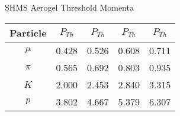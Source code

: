 \begin{Mtable}{SHMS Aerogel Threshold Momenta}
  \centering
  \begin{tabular}{|c|c|c|c|c|}
    \hline
    \textbf{Particle} & \textbf{$P_{Th}$} & \textbf{$P_{Th}$} & \textbf{$P_{Th}$} & \textbf{$P_{Th}$} \\
    \hline
    $\mu$ & 0.428 & 0.526 & 0.608 & 0.711 \\
    $\pi$ & 0.565 & 0.692 & 0.803 & 0.935 \\
    $K$ & 2.000 & 2.453 & 2.840 & 3.315 \\
    $p$ & 3.802 & 4.667 & 5.379 & 6.307 \\
    \hline
  \end{tabular}
  \caption{Threshold momenta ($P_{Th}$ in GeV/c) for a variety of charged particles and the corresponding refractive indices.}
  \label{tab:2-4_aero_threshold}
\end{Mtable}

